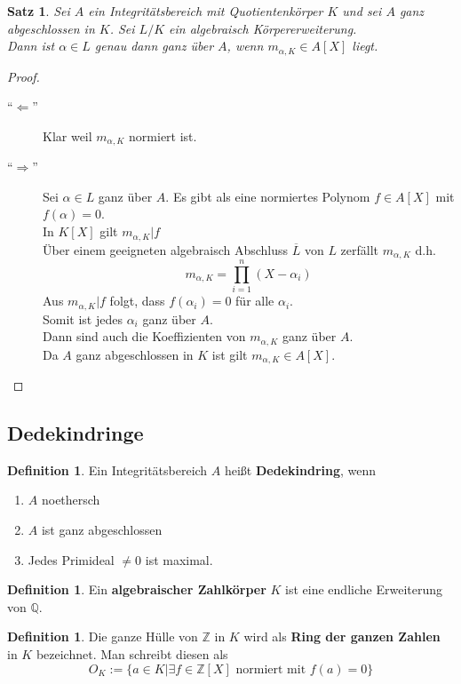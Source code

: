 \documentclass[10pt,a4paper]{article}
\newcommand{\Z}{\ensuremath{\mathbb{Z}}}
\newcommand{\Q}{\ensuremath{\mathbb{Q}}}
\newcommand{\al}{\ensuremath{\alpha}}
\newcommand{\ol}[1]{\overline{#1}}
\theoremstyle{plain}
\newtheorem{satz}[theorem]{Satz}
\theoremstyle{definition}
\newtheorem{definition}[theorem]{Definition}
\theoremstyle{remark}
\begin{document}
	\begin{satz}
		Sei $A$ ein Integritätsbereich mit Quotientenkörper $K$ und sei $A$ ganz abgeschlossen in $K$. Sei $L/K$ ein algebraisch Körpererweiterung.\\
		Dann ist $\al\in L$ genau dann ganz über $A$, wenn $m_{\al,K}\in A[X]$ liegt.
	\end{satz}
	\begin{proof}
		\begin{description}
			\item[\enquote{$\Leftarrow$}] Klar weil $m_{\al,K}$ normiert ist.
			\item[\enquote{$\Rightarrow$}] Sei $\al\in L$ ganz über $A$. Es gibt als eine normiertes Polynom $f\in A[X]$ mit $f(\al)=0$.\\
			In $K[X]$ gilt $m_{\al,K}|f$ \\
			Über einem geeigneten algebraisch Abschluss $\ol L$ von $L$ zerfällt $m_{\al,K}$ d.h.
			\[m_{\al,K}=\prod_{i=1}^n(X-\al_i)\]
			Aus $m_{\al,K}|f$ folgt, dass $f(\al_i)=0$ für alle $\al_i$.\\
			Somit ist jedes $\al_i$ ganz über $A$.\\
			Dann sind auch die Koeffizienten von $m_{\al,K}$ ganz über $A$.\\
			Da $A$ ganz abgeschlossen in $K$ ist gilt $m_{\al,K}\in A[X]$. 
		\end{description}
	\end{proof}



\subsection{Dedekindringe}
	\begin{definition}
		Ein Integritätsbereich $A$ heißt \textbf{Dedekindring}, wenn
		\begin{enumerate}
			\item $A$ noethersch
			\item $A$ ist ganz abgeschlossen
			\item Jedes Primideal $\neq 0$ ist maximal.
		\end{enumerate}
	\end{definition}

	\begin{definition}
		Ein \textbf{algebraischer Zahlkörper} $K$ ist eine endliche Erweiterung von $\Q$.
	\end{definition}

	\begin{definition}
		Die ganze Hülle von $\Z$ in $K$ wird als \textbf{Ring der ganzen Zahlen} in $K$ bezeichnet. Man schreibt diesen als
		\[O_K:=\{a\in K|\exists f\in \Z[X]\text{ normiert mit }f(a)=0 \}\]
	\end{definition}
\end{document}
